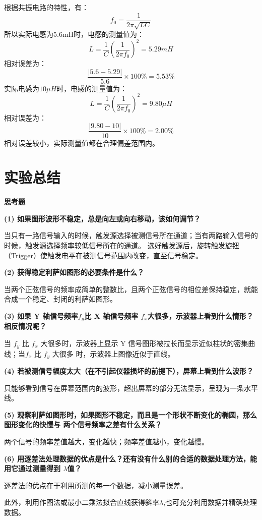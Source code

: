 \documentclass[UTF8]{ctexart}
\begin{document}
\noindent 根据共振电路的特性，有：
$$
f_{0}=\frac{1}{2 \pi \sqrt{L C}}
$$
所以实际电感为5.6mH时，电感的测量值为：
$$
L=\frac{1}{C}(\frac{1}{2\pi f_0})^2=5.29mH
$$
相对误差为：
$$
\frac{|5.6-5.29|}{5.6}\times 100\%=5.53\%
$$
实际电感为$10\mu H$时，电感的测量值为：
$$
L=\frac{1}{C}(\frac{1}{2\pi f_0})^2=9.80\mu H
$$
相对误差为：
$$
\frac{|9.80-10|}{10}\times 100\%=2.00\%
$$
相对误差较小，实际测量值都在合理偏差范围内。

\section{实验总结}

\noindent \textbf{思考题}

\noindent  \textbf{(1) 如果图形波形不稳定，总是向左或向右移动，该如何调节？}

当只有一路信号输入的时候，触发源选择被测信号所在通道；当有两路输入信号的时候，触发源选择频率较低信号所在的通道。
选好触发源后，旋转触发旋钮（Trigger）使触发电平在被测信号范围内改变，直至信号稳定。

\noindent  \textbf{(2) 获得稳定利萨如图形的必要条件是什么？}

当两个正弦信号的频率成简单的整数比，且两个正弦信号的相位差保持稳定，就能合成一个稳定、封闭的利萨如图形。

\noindent  \textbf{(3) 如果 Y 轴信号频率$ f_y $比 X 轴信号频率 $f_x $大很多，示波器上看到什么情形？相反情况呢？}

当 $f_y$ 比 $f_x$ 大很多时，示波器上显示 Y 信号图形被拉长而显示近似柱状的密集曲线；当$ f_x$ 比 $f_y$ 大很多
时，示波器上图像近似于直线。

\noindent  \textbf{(4) 若被测信号幅度太大（在不引起仪器损坏的前提下），屏幕上看到什么波形？}

只能够看到信号在屏幕范围内的波形，超出屏幕的部分无法显示，呈现为一条水平线。

\noindent  \textbf{(5) 观察利萨如图形时，如果图形不稳定，而且是一个形状不断变化的椭圆，那么图形变化的快慢与
两个信号频率之差有什么关系？}

两个信号的频率差值越大，变化越快；频率差值越小，变化越慢。

\noindent  \textbf{(6) 用逐差法处理数据的优点是什么？还有没有什么别的合适的数据处理方法，能用它通过测量得到
$\lambda$值？}

逐差法的优点在于利用所测的每一个数据，减小测量误差。

此外，利用作图法或最小二乘法拟合直线获得斜率$\lambda$,也可充分利用数据并精确处理数据。
\end{document}

